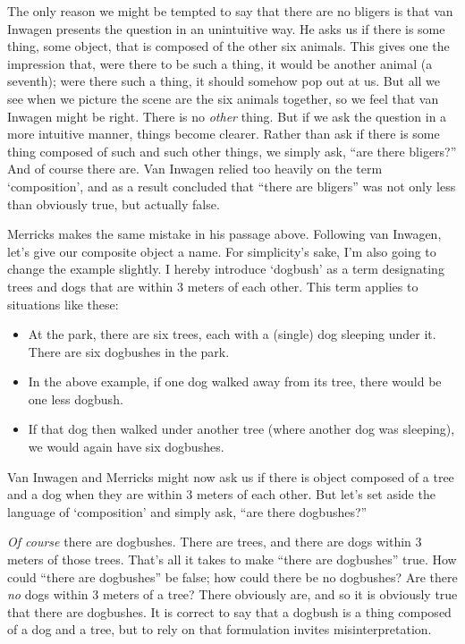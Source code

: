 \documentclass[11pt]{article}
\begin{document}
\begin{spacing}{1.25}
The only reason we might be tempted to say that there are no bligers
is that van Inwagen presents the question in an unintuitive way.  He
asks us if there is some thing, some object, that is composed of the
other six animals.  This gives one the impression that, were there to
be such a thing, it would be another animal (a seventh); were there
such a thing, it should somehow pop out at us.  But all we see when we
picture the scene are the six animals together, so we feel that van
Inwagen might be right.  There is no {\em other} thing.  But if we ask
the question in a more intuitive manner, things become clearer.
Rather than ask if there is some thing composed of such and such other
things, we simply ask, ``are there bligers?''  And of course there
are.  Van Inwagen relied too heavily on the term `composition', and as
a result concluded that ``there are bligers'' was not only less than
obviously true, but actually false.

Merricks makes the same mistake in his passage above.  Following van
Inwagen, let's give our composite object a name.  For simplicity's
sake, I'm also going to change the example slightly.  I hereby
introduce `dogbush' as a term designating trees and dogs that are
within 3 meters of each other.  This term applies to situations like
these:

\begin{itemize}
  \item At the park, there are six trees, each with a (single) dog
    sleeping under it.  There are six dogbushes in the
    park. \label{park}
  \item In the above example, if one dog walked away from its tree,
    there would be one less dogbush.
  \item If that dog then walked under another tree (where another dog
    was sleeping), we would again have six dogbushes.
\end{itemize}

Van Inwagen and Merricks might now ask us if there is object composed
of a tree and a dog when they are within 3 meters of each other.  But
let's set aside the language of `composition' and simply ask, ``are
there dogbushes?''

{\em Of course} there are dogbushes.  There are trees, and there are
dogs within 3 meters of those trees.  That's all it takes to make
``there are dogbushes'' true.  How could ``there are dogbushes'' be
false; how could there be no dogbushes?  Are there {\em no} dogs
within 3 meters of a tree?  There obviously are, and so it is
obviously true that there are dogbushes.  It is correct to say that a
dogbush is a thing composed of a dog and a tree, but to rely on that
formulation invites misinterpretation.


\end{spacing}
\end{document}
